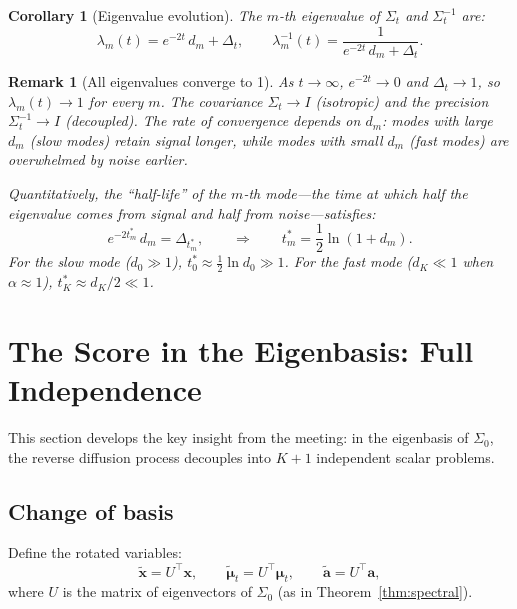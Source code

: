 \documentclass[11pt,a4paper]{article}
\newtheorem{corollary}[theorem]{Corollary}
\newtheorem{remark}[theorem]{Remark}
\newcommand{\Dt}{\Delta_t}
\begin{document}
\begin{corollary}[Eigenvalue evolution]\label{cor:eigenvalue-evolution}
The $m$-th eigenvalue of $\Sigma_t$ and $\Sigma_t^{-1}$ are:
\begin{equation}\label{eq:eigenvalue-t}
  \lambda_m(t) = e^{-2t}\,d_m + \Dt, \qquad
  \lambda_m^{-1}(t) = \frac{1}{e^{-2t}\,d_m + \Dt}.
\end{equation}
\end{corollary}

\begin{remark}[All eigenvalues converge to 1]\label{rem:convergence-to-1}
As $t \to \infty$, $e^{-2t} \to 0$ and $\Dt \to 1$, so $\lambda_m(t) \to 1$ for every $m$.  The covariance $\Sigma_t \to I$ (isotropic) and the precision $\Sigma_t^{-1} \to I$ (decoupled).  The rate of convergence depends on $d_m$: modes with large $d_m$ (slow modes) retain signal longer, while modes with small $d_m$ (fast modes) are overwhelmed by noise earlier.

Quantitatively, the ``half-life'' of the $m$-th mode---the time at which half the eigenvalue comes from signal and half from noise---satisfies:
\begin{equation}\label{eq:half-life}
  e^{-2t_m^*}\,d_m = \Dt_{m}^*, \qquad \Longrightarrow \qquad
  t_m^* = \frac{1}{2}\ln(1 + d_m).
\end{equation}
For the slow mode ($d_0 \gg 1$), $t_0^* \approx \frac{1}{2}\ln d_0 \gg 1$.  For the fast mode ($d_K \ll 1$ when $\alpha \approx 1$), $t_K^* \approx d_K/2 \ll 1$.
\end{remark}

\section{The Score in the Eigenbasis: Full Independence}
\label{sec:eigenbasis}

This section develops the key insight from the meeting: in the eigenbasis of $\Sigma_0$, the reverse diffusion process decouples into $K+1$ independent scalar problems.

\subsection{Change of basis}

Define the rotated variables:
\begin{equation}\label{eq:rotation}
  \tilde{\mathbf{x}} = U^\top \mathbf{x}, \qquad \tilde{\bm{\mu}}_t = U^\top \bm{\mu}_t, \qquad \tilde{\mathbf{a}} = U^\top \mathbf{a},
\end{equation}
where $U$ is the matrix of eigenvectors of $\Sigma_0$ (as in Theorem~\ref{thm:spectral}).
\end{document}
